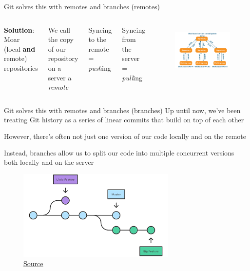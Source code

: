 \documentclass[pdf]{beamer} %
\begin{document}
\begin{frame}[t]{Git solves this with remotes and branches (remotes)}
    \begin{columns}

        \textbf{Solution}: Moar (local \textbf{and} remote) repositories

        \bigskip
        We call the copy of our repository on a server a \emph{remote}

        \bigskip
        Syncing to the remote = \emph{push}ing

        \bigskip
        Syncing from the server = \emph{pull}ing

    \begin{figure}[htpb]
        \centering
        \includegraphics[width=0.8\linewidth]{fig/git-local-remote.png}
        \label{fig:fig/git-local-remote}
    \end{figure}
        
    \end{columns}

\end{frame}

\begin{frame}[t]{Git solves this with remotes and branches (branches)}
    Up until now, we've been treating Git history as a series of linear commits that build on top of each other

    \bigskip
    However, there's often not just one version of our code locally and on the remote

    \bigskip
    Instead, branches allow us to split our code into multiple concurrent versions both locally and on the server

    \begin{figure}[htpb]
        \centering
        \includegraphics[width=0.6\linewidth]{fig/git-branches.png}
        \caption{\href{https://www.atlassian.com/git/tutorials/using-branches}{Source}}
        \label{fig:fig/git-branches}
    \end{figure}
\end{frame}
\end{document}
